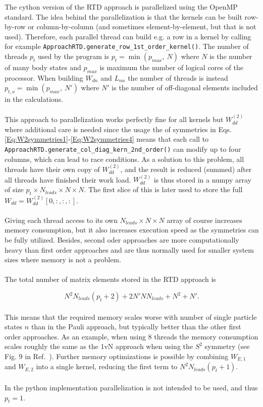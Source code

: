 \documentclass{article}
\begin{document}
The cython version of the RTD approach is parallelized using the OpenMP standard. The idea behind the parallelization is that the kernels can be built row-by-row or column-by-column (and sometimes element-by-element, but that is not used). Therefore, each parallel thread can build e.g. a row in a kernel by calling for example \verb!ApproachRTD.generate_row_1st_order_kernel()!. The number of threads $p_t$ used by the program is $p_t=\min(p_{max},\ N)$ where $N$ is the number of many body states and $p_{max}$ is maximum the number of logical cores of the processor. When building $W_{dn}$ and $L_{nn}$ the number of threads is instead $p_{t,o}=\min(p_{max},\ N')$ where $N'$ is the number of off-diagonal elements included in the calculations. 
\\
\\
This approach to parallelization works perfectly fine for all kernels but $W_{dd}^{(2)}$ where additional care is needed since the usage the of symmetries in Eqs. \ref{Eq:W2symmetries1}-\ref{Eq:W2symmetries4} means that each call to \verb!ApproachRTD.generate_col_diag_kern_2nd_order()! can modify up to four columns, which can lead to race conditions. As a solution to this problem, all threads have their own copy of $W_{dd}^{(2)}$, and the result is reduced (summed) after all threads have finished their work load. $W_{dd}^{(2)}$ is thus stored in a numpy array of size $p_t \times N_{leads} \times N \times N$. The first slice of this is later used to store the full $W_{dd} = W_{dd}^{(2)}[0,:,:,:]$.
\\
\\
Giving each thread access to its own $N_{leads} \times N \times N$ array of course increases memory consumption, but it also increases execution speed as the symmetries can be fully utilized. Besides, second oder approaches are more computationally heavy than first order approaches and are thus normally used for smaller system sizes where memory is not a problem.
\\
\\
The total number of matrix elements stored in the RTD approach is

\begin{equation}
    N^2  N_{leads} (p_t + 2 ) + 2N'N N_{leads} + N^2 + N'.
\end{equation}
\\
This means that the required memory scales worse with number of single particle states $n$ than in the Pauli approach, but typically better than the other first order approaches. As an example, when using 8 threads the memory consumption scales roughly the same as the 1vN approach when using the $S^2$ symmetry (see Fig. 9 in Ref.~\cite{kirvsanskas2017qmeq}). Further memory optimizations is possible by combining $W_{E,1}$ and $W_{E,2}$ into a single kernel, reducing the first term to $ N^2  N_{leads} (p_t + 1 ) $.
\\
\\
In the python implementation parallelization is not intended to be used, and thus $p_t=1$. 


\end{document}
